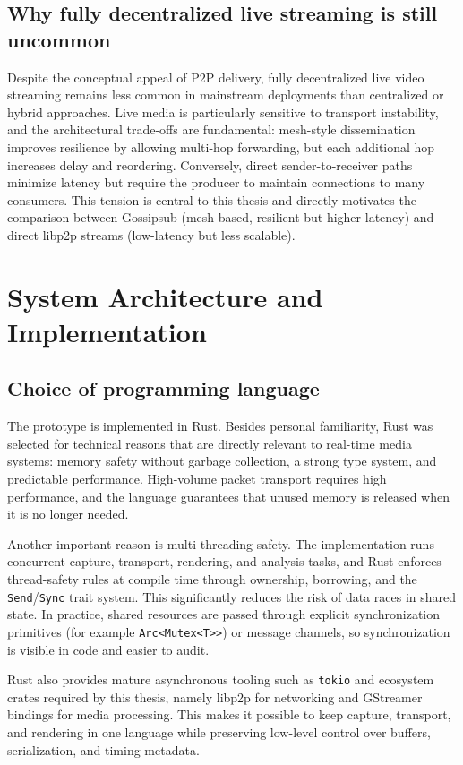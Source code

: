 \subsection{Why fully decentralized live streaming is still uncommon}
Despite the conceptual appeal of \ac{P2P} delivery, fully decentralized live video streaming remains less common in mainstream deployments than centralized or hybrid approaches. Live media is particularly sensitive to transport instability, and the architectural trade-offs are fundamental: mesh-style dissemination improves resilience by allowing multi-hop forwarding, but each additional hop increases delay and reordering. Conversely, direct sender-to-receiver paths minimize latency but require the producer to maintain connections to many consumers. This tension is central to this thesis and directly motivates the comparison between Gossipsub (mesh-based, resilient but higher latency) and direct libp2p streams (low-latency but less scalable).



\section{System Architecture and Implementation}
\subsection{Choice of programming language}
The prototype is implemented in Rust. Besides personal familiarity, Rust was selected for technical reasons that are directly relevant to real-time media systems: memory safety without garbage collection, a strong type system, and predictable performance.
High-volume packet transport requires high performance, and the language guarantees that unused memory is released when it is no longer needed.

Another important reason is multi-threading safety. The implementation runs concurrent capture, transport, rendering, and analysis tasks, and Rust enforces thread-safety rules at compile time through ownership, borrowing, and the \texttt{Send}/\texttt{Sync} trait system.
This significantly reduces the risk of data races in shared state.
In practice, shared resources are passed through explicit synchronization primitives (for example \texttt{Arc<Mutex<T>>}) or message channels, so synchronization is visible in code and easier to audit.

Rust also provides mature asynchronous tooling such as \texttt{tokio} and ecosystem crates required by this thesis, namely libp2p for networking and GStreamer bindings for media processing.
This makes it possible to keep capture, transport, and rendering in one language while preserving low-level control over buffers, serialization, and timing metadata.

